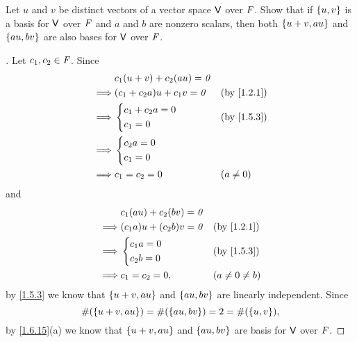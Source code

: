 \exercisesection

\setcounter{ex}{10}
\begin{ex}\label{ex:1.6.11}
  Let \(u\) and \(v\) be distinct vectors of a vector space \(\mathsf{V}\) over \(\mathit{F}\).
  Show that if \(\left\lbrace u, v\right\rbrace\) is a basis for \(\mathsf{V}\) over \(\mathit{F}\) and \(a\) and \(b\) are nonzero scalars, then both \(\left\lbrace u + v, au\right\rbrace\) and \(\left\lbrace au, bv\right\rbrace\) are also bases for \(\mathsf{V}\) over \(\mathit{F}\).
\end{ex}

\begin{proof}[]
  Let \(c_1, c_2 \in \mathit{F}\).
  Since
  \begin{align*}
             & c_1 (u + v) + c_2 (au) = \zv                                \\
    \implies & (c_1 + c_2 a) u + c_1 v = \zv &  & \text{(by \cref{1.2.1})} \\
    \implies & \begin{dcases}
      c_1 + c_2 a = 0 \\
      c_1 = 0
    \end{dcases}    &  & \text{(by \cref{1.5.3})} \\
    \implies & \begin{dcases}
      c_2 a = 0 \\
      c_1 = 0
    \end{dcases}                                  \\
    \implies & c_1 = c_2 = 0                 &  & (a \neq 0)
  \end{align*}
  and
  \begin{align*}
             & c_1 (au) + c_2 (bv) = \zv                                 \\
    \implies & (c_1 a) u + (c_2 b) v = \zv &  & \text{(by \cref{1.2.1})} \\
    \implies & \begin{dcases}
      c_1 a = 0 \\
      c_2 b = 0
    \end{dcases}  &  & \text{(by \cref{1.5.3})} \\
    \implies & c_1 = c_2 = 0,              &  & (a \neq 0 \neq b)
  \end{align*}
  by \cref{1.5.3} we know that \(\left\lbrace u + v, au\right\rbrace\) and \(\left\lbrace au, bv\right\rbrace\) are linearly independent.
  Since
  \[
    \#(\left\lbrace u + v, au\right\rbrace) = \#(\left\lbrace au, bv\right\rbrace) = 2 = \#(\left\lbrace u, v\right\rbrace),
  \]
  by \cref{1.6.15}(a) we know that \(\left\lbrace u + v, au\right\rbrace\) and \(\left\lbrace au, bv\right\rbrace\) are basis for \(\mathsf{V}\) over \(\mathit{F}\).
\end{proof}

